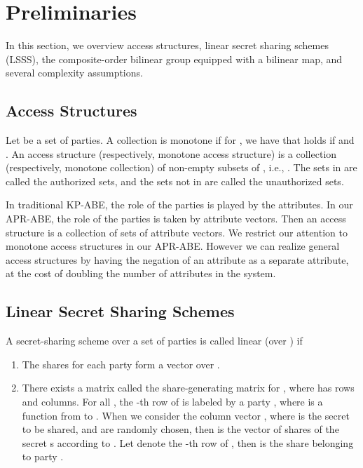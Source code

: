 \documentclass[twocolumn]{svjour3}          \smartqed  \usepackage{graphicx}
\begin{document}
\section{Preliminaries}
\label{background}
In this section, we overview access structures, linear secret sharing schemes (LSSS), the composite-order bilinear group equipped with a bilinear map, and several complexity assumptions.

\subsection{Access Structures \cite{Bei96}}
\label{sec21}

\begin{definition}\label{accstr} Let  be a set of parties. A collection  is
monotone if for , we have that  holds if  and . An access structure (respectively,
monotone access structure) is a collection (respectively, monotone collection)  of non-empty subsets of , i.e.,
. The sets in  are called the authorized sets, and the sets not in
 are called the unauthorized sets.
\end{definition}

In traditional KP-ABE, the role of the parties is played by the attributes. In our APR-ABE, the role of the parties is taken by
attribute vectors. Then an access structure is a collection of sets of attribute vectors. We restrict our attention to  monotone access structures in our APR-ABE. However we can realize general access structures by having the negation
of an attribute as a separate attribute, at the cost of doubling the number of attributes in the system.

\subsection{Linear Secret Sharing Schemes \cite{Bei96}}

\begin{definition} \label{LSSS}A secret-sharing scheme  over a set of parties  is called linear (over ) if
\begin{enumerate}
  \item The shares for each party form a vector over .
  \item There exists a matrix  called the share-generating matrix for , where  has  rows and  columns. For all , the -th row of  is labeled by a party , where  is a function from  to .
      When we consider the column vector , where  is the secret to be shared, and  are randomly chosen, then  is the vector of  shares of the secret s according to . Let  denote the
      -th row of , then  is the share belonging to party .
\end{enumerate}
\end{definition}
\end{document}

